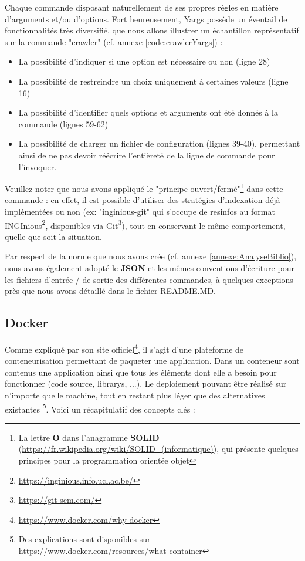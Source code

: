 Chaque commande disposant naturellement de ses propres règles en matière d'arguments et/ou d'options.
Fort heureusement, Yargs possède un éventail de fonctionnalités très diversifié, que nous allons illustrer un échantillon représentatif sur la commande "crawler" (cf. annexe \ref{code:crawlerYargs}) :
\begin{itemize}[nosep,noitemsep,topsep=0pt,partopsep=0pt,after=\vspace*{2pt}]
    \item La possibilité d'indiquer si une option est nécessaire ou non (ligne 28)
    \item La possibilité de restreindre un choix uniquement à certaines valeurs (ligne 16)
    \item La possibilité d'identifier quels options et arguments ont été donnés à la commande (lignes 59-62)
    \item La possibilité de charger un fichier de configuration (lignes 39-40), permettant ainsi de ne pas devoir réécrire l'entièreté de la ligne de commande pour l'invoquer. 
\end{itemize}
Veuillez noter que nous avons appliqué le "principe ouvert/fermé"\footnote{
    La lettre \textbf{O} dans l'anagramme \textbf{SOLID} (\url{https://fr.wikipedia.org/wiki/SOLID\_(informatique)}), qui présente quelques principes pour la programmation orientée objet
} dans cette commande : en effet, il est possible d'utiliser des stratégies d'indexation déjà implémentées ou non (ex: "inginious-git" qui s'occupe de \glspl{resinfo} au format INGInious\footnote{
    \url{https://inginious.info.ucl.ac.be/}
}, disponibles via Git\footnote{
    \url{https://git-scm.com/}
}), tout en conservant le même comportement, quelle que soit la situation. 

Par respect de la norme que nous avons crée (cf. annexe \ref{annexe:AnalyseBiblio}), nous avons également adopté le \textbf{JSON} et les mêmes conventions d'écriture 
pour les fichiers d'entrée / de sortie des différentes commandes, à quelques exceptions près que nous avons détaillé dans le fichier README.MD. 

\pagebreak
\subsection{Docker}
\label{section:docker}

Comme expliqué par son site officiel\footnote{
    \url{https://www.docker.com/why-docker}
}, il s'agit d'une plateforme de conteneurisation permettant de paqueter une application.
Dans un conteneur sont contenus une application ainsi que tous les éléments dont elle a besoin pour fonctionner (code source, \glspl{library}, ...).
Le \gls{deploiement} pouvant être réalisé sur n'importe quelle machine, tout en restant plus léger que des alternatives existantes
\footnote{
    Des explications sont disponibles sur \url{https://www.docker.com/resources/what-container}
}.
Voici un récapitulatif des concepts clés :


